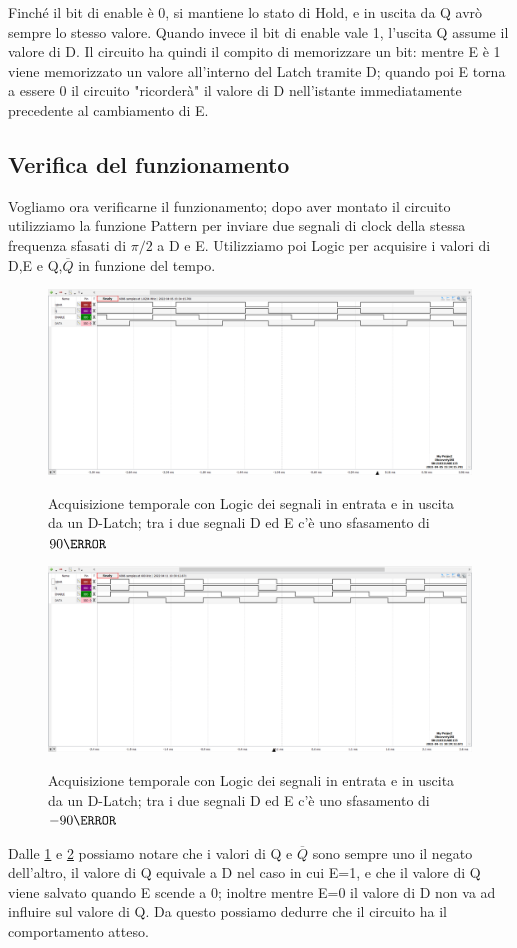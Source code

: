 \documentclass[10pt, a4paper, italian]{article}
\begin{document}
Finché il bit di enable è 0, si mantiene lo stato di Hold, e in uscita da Q avrò sempre lo stesso valore.
Quando invece il bit di enable vale 1, l'uscita Q assume il valore di D.
Il circuito ha quindi il compito di memorizzare un bit: mentre E è 1 viene memorizzato un valore all'interno del Latch tramite D; quando poi E torna a essere 0 il circuito "ricorderà" il valore di D nell'istante immediatamente precedente al cambiamento di E.
\subsection{Verifica del funzionamento}
Vogliamo ora verificarne il funzionamento; dopo aver montato il circuito utilizziamo la funzione Pattern per inviare due segnali di clock della stessa frequenza sfasati di $\pi /2$ a D e E.
Utilizziamo poi Logic per acquisire i valori di D,E e Q,$\overline{Q}$ in funzione del tempo.
\begin{figure}
	\includegraphics[width=\textwidth]{latch1}
	\label{fig: Log_DLATCH1}
	\caption{Acquisizione temporale con Logic dei segnali in entrata e in uscita da un D-Latch; tra i due segnali D ed E c'è uno sfasamento di $90 \degree$}
\end{figure}
\begin{figure}
	\includegraphics[width=\textwidth]{latch2}
	\label{fig: Log_DLATCH2}
	\caption{Acquisizione temporale con Logic dei segnali in entrata e in uscita da un D-Latch; tra i due segnali D ed E c'è uno sfasamento di $-90 \degree$}
\end{figure}
Dalle \cref{fig: Log_DLATCH1} e \cref{fig: Log_DLATCH2} possiamo notare che i valori di Q e $\overline{Q}$ sono sempre uno il negato dell'altro, il valore di Q equivale a D nel caso in cui E=1, e che il valore di Q viene salvato quando E scende a 0; inoltre mentre E=0 il valore di D non va ad influire sul valore di Q.
Da questo possiamo dedurre che il circuito ha il comportamento atteso.
\end{document}
